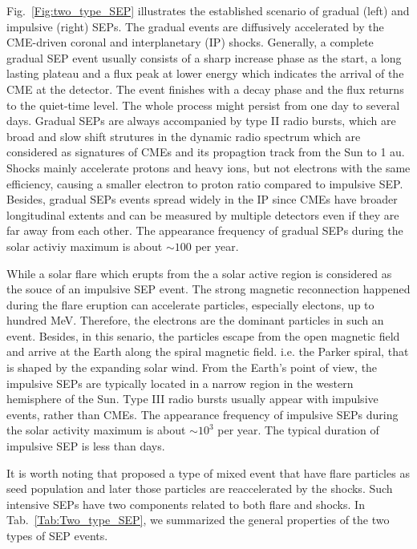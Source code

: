 Fig.~\ref{Fig:two_type_SEP} illustrates the established scenario of gradual (left) and impulsive (right) \acp{SEP}.
The gradual events are diffusively accelerated by the \ac{CME}-driven coronal and interplanetary (IP) shocks. Generally, a complete gradual \ac{SEP} event usually consists of a sharp increase phase as the start, a long lasting plateau and a flux peak at lower energy which indicates the arrival of the \ac{CME} at the detector. The event finishes with a decay phase and the flux returns to the quiet-time level. The whole process might persist from one day to several days. Gradual \acp{SEP} are always accompanied by type II radio bursts, which are broad and slow shift strutures in the dynamic radio spectrum which are considered as signatures of \acp{CME} and its propagtion track from the Sun to 1 au. Shocks mainly accelerate protons and heavy ions, but not electrons with the same efficiency, causing a smaller electron to proton ratio compared to impulsive \ac{SEP}. Besides, gradual \acp{SEP} events spread widely in the IP since \acp{CME} have broader longitudinal extents and can be measured by multiple detectors even if they are far away from each other. 
The appearance frequency of gradual \acp{SEP} during the solar activiy maximum is about $\sim 100$ per year.

While a solar flare which erupts from the a solar active region is considered as the souce of an impulsive \ac{SEP} event. The strong magnetic reconnection happened during the flare eruption can accelerate particles, especially electons, up to hundred MeV. Therefore, the electrons are the dominant particles in such an event. Besides, in this senario, the particles escape from the open magnetic field and arrive at the Earth along the spiral magnetic field. i.e. the Parker spiral, \citep{Parker-1958} that is shaped by the expanding solar wind. From the Earth's point of view, the impulsive \acp{SEP} are typically located in a narrow region in the western hemisphere of the Sun. Type III radio bursts usually appear with impulsive events, rather than \acp{CME}.
The appearance frequency of impulsive \acp{SEP} during the solar activity maximum is about $\sim 10^3$ per year. The typical duration of impulsive \ac{SEP} is less than days.

It is worth noting that \citep{cane2003two} proposed a type of mixed event that have flare particles as seed population and later those particles are reaccelerated by the shocks. Such intensive \acp{SEP} have two components related to both flare and shocks.  %
In Tab.~\ref{Tab:Two_type_SEP}, we summarized the general properties of the two types of \ac{SEP} events.

